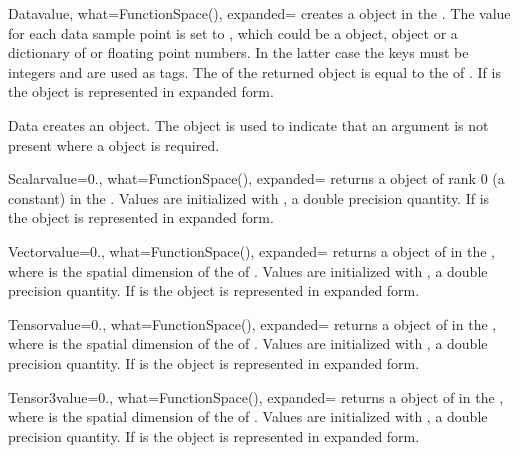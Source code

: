 \begin{classdesc}{Data}{value, what=FunctionSpace(), expanded=\False}
creates a \Data object in the \FunctionSpace {}.
The value for each data sample point is set to , which could be a
\numpy object, \Data object or a dictionary of \numpy or floating point
numbers. In the latter case the keys must be integers and are used as tags.
The \Shape of the returned object is equal to the \Shape of .
If  is \True the \Data object is represented in expanded form.
\end{classdesc}

\begin{classdesc}{Data}{}
creates an \EmptyData object. The \EmptyData object is used to indicate that
an argument is not present where a \Data object is required.
\end{classdesc}

\begin{funcdesc}{Scalar}{value=0., what=FunctionSpace(), expanded=\False}
returns a \Data object of rank 0 (a constant) in the \FunctionSpace {}.
Values are initialized with , a double precision quantity.
If  is \True the \Data object is represented in expanded form.
\end{funcdesc}

\begin{funcdesc}{Vector}{value=0., what=FunctionSpace(), expanded=\False}
returns a \Data object of \Shape {} in the \FunctionSpace {},
where  is the spatial dimension of the \Domain of .
Values are initialized with , a double precision quantity.
If  is \True the \Data object is represented in expanded form.
\end{funcdesc}

\begin{funcdesc}{Tensor}{value=0., what=FunctionSpace(), expanded=\False}
returns a \Data object of \Shape {} in the \FunctionSpace {},
where  is the spatial dimension of the \Domain of .
Values are initialized with , a double precision quantity.
If  is \True the \Data object is represented in expanded form.
\end{funcdesc}

\begin{funcdesc}{Tensor3}{value=0., what=FunctionSpace(), expanded=\False}
returns a \Data object of \Shape {} in the \FunctionSpace {},
where  is the spatial dimension of the \Domain of .
Values are initialized with , a double precision quantity.
If  is \True the \Data object is represented in expanded form.
\end{funcdesc}

